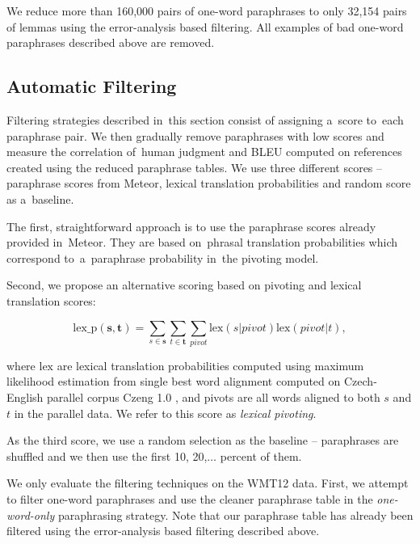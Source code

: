 We reduce more than 160,000 pairs of one-word paraphrases to only 32,154 pairs 
of lemmas using the error-analysis based filtering. All examples of bad one-word 
paraphrases described above are removed.

\subsection{Automatic Filtering}
Filtering strategies described in~this section consist of assigning a~score 
to~each paraphrase pair. We then gradually remove paraphrases with low scores 
and measure the correlation of~human judgment and BLEU computed on references 
created using the reduced paraphrase tables. We use three different scores -- 
paraphrase scores from Meteor, lexical translation probabilities and random 
score as a~baseline.

The first, straightforward approach is to use the paraphrase scores already 
provided in~Meteor. They are based on~phrasal translation probabilities which 
correspond to~a~paraphrase probability in~the pivoting model.

Second, we propose an alternative scoring based on pivoting and lexical 
translation scores:

$$\text{lex\_p}(\mathbf{s},\mathbf{t}) = \sum_{s \in \mathbf{s}}\sum_{t \in
\mathbf{t}}\sum_{pivot}\text{lex}(s|pivot)\text{lex}(pivot|t),$$

where $\text{lex}$ are lexical translation probabilities computed using maximum 
likelihood estimation from single best word alignment computed on
Czech-English parallel corpus Czeng 1.0 \citep{czeng10:lrec2012}, and pivots  
are all words aligned to both $s$ and $t$ in the parallel data. We refer to 
this score as \emph{lexical pivoting}.

As the third score, we use a random selection as the baseline -- paraphrases 
are shuffled and we then use the first 10, 20,$\ldots$ percent of them.

We only evaluate the filtering techniques on the WMT12 data. First, we attempt 
to filter one-word paraphrases and use the cleaner paraphrase table in the 
\emph{one-word-only} paraphrasing strategy. Note that our paraphrase table 
has already been filtered using the error-analysis based filtering described above.

